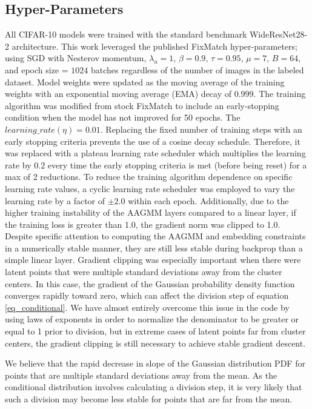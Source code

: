 \documentclass[10pt,twocolumn,letterpaper]{article}
\begin{document}
\subsection{Hyper-Parameters}
\label{hyperparams}

All CIFAR-10 models were trained with the standard benchmark WideResNet28-2 architecture.
This work leveraged the published FixMatch \cite{sohn2020fixmatch} hyper-parameters; using SGD with Nesterov momentum,  $\lambda_u = 1$, $\beta = 0.9$, $\tau = 0.95$, $\mu = 7$, $B = 64$, and epoch size = $1024$ batches regardless of the number of images in the labeled dataset.
Model weights were updated as the moving average of the training weights with an exponential moving average (EMA) decay of $0.999$.
The training algorithm was modified from stock FixMatch to include an early-stopping condition when the model has not improved for 50 epochs.
The $learning\_rate (\eta) = 0.01$.
Replacing the fixed number of training steps with an early stopping criteria prevents the use of a cosine decay schedule.
Therefore, it was replaced with a plateau learning rate scheduler which multiplies the learning rate by $0.2$ every time the early stopping criteria is met (before being reset) for a max of 2 reductions.
To reduce the training algorithm dependence on specific learning rate values, a cyclic learning rate scheduler was employed to vary the learning rate by a factor of $\pm2.0$ within each epoch.
Additionally, due to the higher training instability of the AAGMM layers compared to a linear layer, if the training loss is greater than 1.0, the gradient norm was clipped to 1.0.
Despite specific attention to computing the AAGMM and embedding constraints in a numerically stable manner, they are still less stable during backprop than a simple linear layer.  
Gradient clipping was especially important when there were latent points that were multiple standard deviations away from the cluster centers.  
In this case, the gradient of the Gaussian probability density function converges rapidly toward zero, which can affect the division step of equation \ref{eq_conditional}.  
We have almost entirely overcome this issue in the code by using laws of exponents in order to normalize the denominator to be greater or equal to 1 prior to division, but in extreme cases of latent points far from cluster centers, the gradient clipping is still necessary to achieve stable gradient descent.

We believe that the rapid decrease in slope of the Gaussian distribution PDF for points that are multiple standard deviations away from the mean.  
As the conditional distribution involves calculating a division step, it is very likely that such a division may become less stable for points that are far from the mean.  
\end{document}
